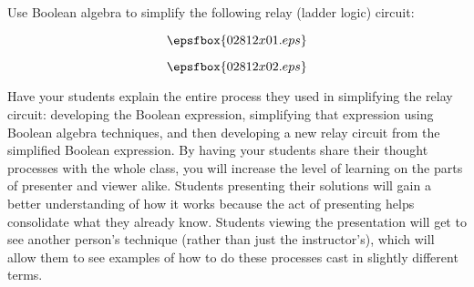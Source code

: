 

Use Boolean algebra to simplify the following relay (ladder logic) circuit:

$$\epsfbox{02812x01.eps}$$







$$\epsfbox{02812x02.eps}$$







Have your students explain the entire process they used in simplifying the relay circuit: developing the Boolean expression, simplifying that expression using Boolean algebra techniques, and then developing a new relay circuit from the simplified Boolean expression.  By having your students share their thought processes with the whole class, you will increase the level of learning on the parts of presenter and viewer alike.  Students presenting their solutions will gain a better understanding of how it works because the act of presenting helps consolidate what they already know.  Students viewing the presentation will get to see another person's technique (rather than just the instructor's), which will allow them to see examples of how to do these processes cast in slightly different terms.




